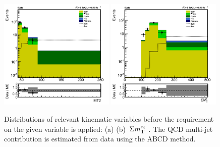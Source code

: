 \begin{figure}[htbp]
\centering
\includegraphics[width=0.49\textwidth]{QCDbginTauTau/Bin1_QCDdatadriven2.png}
\includegraphics[width=0.49\textwidth]{QCDbginTauTau/Bin2_QCDdatadriven2.png} \\
\caption{Distributions of relevant kinematic variables before the requirement on the given variable
is applied: (a) \mttwo  (b) $\,\Sigma m_{\rm T}^{\tau_i}$ . The QCD multi-jet contribution is estimated from data using the ABCD method.}
\label{fig:5QCDbg}
\end{figure}















